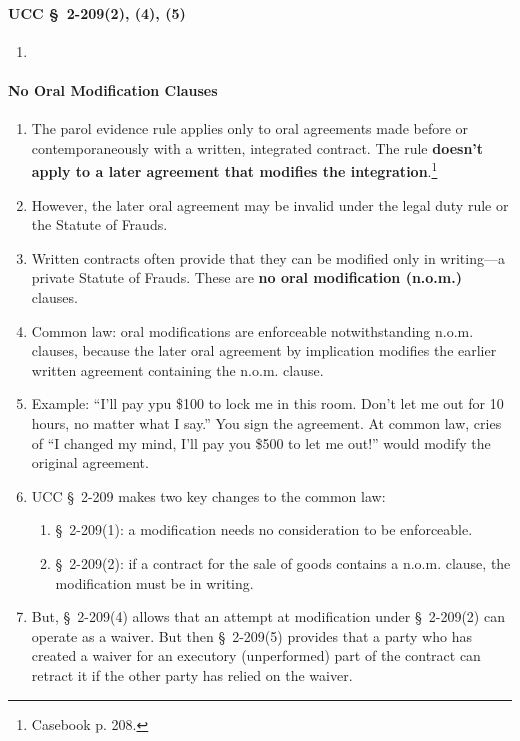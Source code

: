 \paragraph{UCC \S\ 2-209(2), (4), (5)}

\begin{enumerate}
    \item %
\end{enumerate}

\paragraph{No Oral Modification Clauses}

\begin{enumerate}
    \item The parol evidence rule applies only to oral agreements made before 
    or contemporaneously with a written, integrated contract. The rule 
    \textbf{doesn't apply to a later agreement that modifies the 
    integration}.\footnote{Casebook p. 208.}
    \item However, the later oral agreement may be invalid under the legal 
    duty rule or the Statute of Frauds.
    \item Written contracts often provide that they can be modified only in 
    writing---a private Statute of Frauds. These are \textbf{no oral 
    modification (n.o.m.)} clauses.
    \item Common law: oral modifications are enforceable notwithstanding 
    n.o.m. clauses, because the later oral agreement by implication modifies 
    the earlier written agreement containing the n.o.m. clause.
    \item Example: ``I'll pay ypu \$100 to lock me in this room. Don't let me 
    out for 10 hours, no matter what I say.'' You sign the agreement. At 
    common law, cries of ``I changed my mind, I'll pay you \$500 to let me 
    out!'' would modify the original agreement.
    \item UCC \S\ 2-209 makes two key changes to the common law:
    \begin{enumerate}
        \item \S\ 2-209(1): a modification needs no consideration to be 
        enforceable.
        \item \S\ 2-209(2): if a contract for the sale of goods contains a 
        n.o.m. clause, the modification must be in writing.
    \end{enumerate}
    \item But, \S\ 2-209(4) allows that an attempt at modification under \S\ 
    2-209(2) can operate as a waiver. But then \S\ 2-209(5) provides that a 
    party who has created a waiver for an executory (unperformed) part of the 
    contract can retract it if the other party has relied on the waiver.
\end{enumerate}

